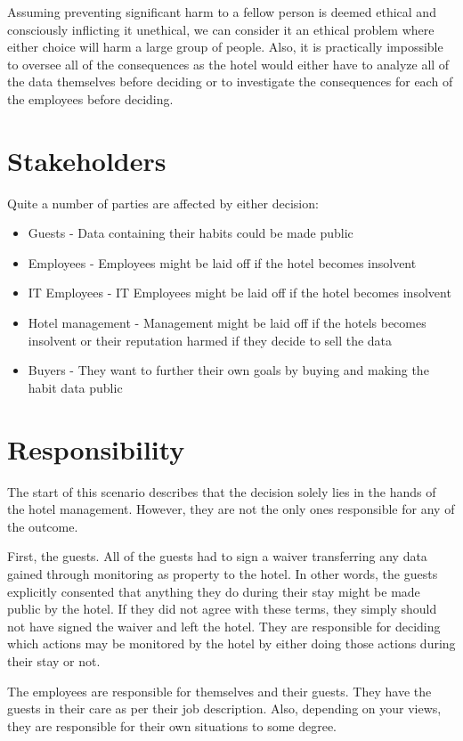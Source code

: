 Assuming preventing significant harm to a fellow person is deemed ethical and consciously inflicting it unethical, we can consider it an ethical problem where either choice will harm a large group of people. Also, it is practically impossible to oversee all of the consequences as the hotel would either have to analyze all of the data themselves before deciding or to investigate the consequences for each of the employees before deciding.

\section{Stakeholders}
Quite a number of parties are affected by either decision:

\begin{itemize}
	\item Guests - Data containing their habits could be made public
	\item Employees - Employees might be laid off if the hotel becomes insolvent
	\item IT Employees - IT Employees might be laid off if the hotel becomes insolvent
	\item Hotel management - Management might be laid off if the hotels becomes insolvent or their reputation harmed if they decide to sell the data
	\item Buyers - They want to further their own goals by buying and making the habit data public
\end{itemize}


\section{Responsibility}
The start of this scenario describes that the decision solely lies in the hands of the hotel management. However, they are not the only ones responsible for any of the outcome.

First, the guests. All of the guests had to sign a waiver transferring any data gained through monitoring as property to the hotel. In other words, the guests explicitly consented that anything they do during their stay might be made public by the hotel. If they did not agree with these terms, they simply should not have signed the waiver and left the hotel. They are responsible for deciding which actions may be monitored by the hotel by either doing those actions during their stay or not.

The employees are responsible for themselves and their guests. They have the guests in their care as per their job description. Also, depending on your views, they are responsible for their own situations to some degree.

